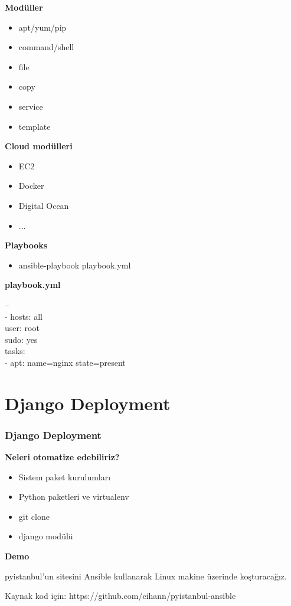 \documentclass{beamer}
\begin{document}
\begin{frame}
\textbf{Modüller}
\begin{itemize}
\item apt/yum/pip
\item command/shell
\item file
\item copy
\item service
\item template
\end{itemize}

\vspace{0.25in}

\textbf{Cloud modülleri}
\begin{itemize}
\item EC2
\item Docker
\item Digital Ocean
\item ...
\end{itemize}
\end{frame}



\begin{frame}
\textbf{Playbooks}
\begin{itemize}
\item ansible-playbook playbook.yml
\end{itemize}

\vspace{0.25in}

\textbf{playbook.yml}

--\\
- hosts: all\\
    user: root\\
    sudo: yes\\
  
  tasks:\\
    - apt: name=nginx state=present

\end{frame}




\section{Django Deployment}

\begin{frame}[fragile]
\frametitle{Django Deployment}
\textbf{Neleri otomatize edebiliriz?}
\begin{itemize}
\item Sistem paket kurulumları
\item Python paketleri ve virtualenv
\item git clone
\item django modülü
\end{itemize}


\vspace{0.25in}


\textbf{Demo}

pyistanbul'un sitesini Ansible kullanarak Linux makine üzerinde koşturacağız. 

Kaynak kod için: https://github.com/cihann/pyistanbul-ansible


\end{frame}


\end{document}
